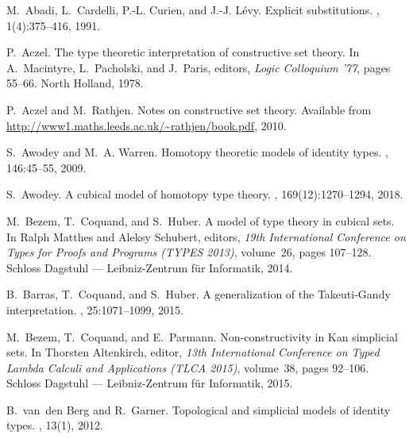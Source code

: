 \documentclass[reqno,10pt,a4paper,oneside]{amsart}
\numberwithin{equation}{section}
\theoremstyle{mythm}
\theoremstyle{mydef}
\theoremstyle{myrmk}
\begin{document}
\newcommand{\noopsort}[1]{}
\begin{thebibliography}{{\noopsort{Berg A}}dBM15}

M.~Abadi, L.~Cardelli, P.-L. Curien, and J.-J. L\'evy.
\newblock Explicit substitutions.
, 1(4):375--416, 1991.

P.~Aczel.
\newblock The type theoretic interpretation of constructive set theory.
\newblock In A.~Macintyre, L.~Pacholski, and J.~Paris, editors, {\em Logic
  Colloquium '77}, pages 55--66. North Holland, 1978.

P.~Aczel and M.~Rathjen.
\newblock Notes on constructive set theory.
\newblock Available from \url{http://www1.maths.leeds.ac.uk/~rathjen/book.pdf},
  2010.

S.~Awodey and M.~A. Warren.
\newblock Homotopy theoretic models of identity types.
, 146:45--55, 2009.

S.~Awodey.
\newblock A cubical model of homotopy type theory.
, 169(12):1270--1294, 2018.

M.~Bezem, T.~Coquand, and S.~Huber.
\newblock A model of type theory in cubical sets.
\newblock In Ralph Matthes and Aleksy Schubert, editors, {\em 19th
  International Conference on Types for Proofs and Programs (TYPES 2013)},
  volume~26, pages 107--128. Schloss Dagstuhl --- Leibniz-Zentrum f{\"u}r
  Informatik, 2014.

B.~Barras, T.~Coquand, and S.~Huber.
\newblock A generalization of the {T}akeuti-{G}andy interpretation.
, 25:1071--1099,
  2015.

M.~Bezem, T.~Coquand, and E.~Parmann.
\newblock Non-constructivity in {K}an simplicial sets.
\newblock In Thorsten Altenkirch, editor, {\em 13th International Conference on
  Typed Lambda Calculi and Applications (TLCA 2015)}, volume~38, pages 92--106.
  Schloss Dagstuhl --- Leibniz-Zentrum f{\"u}r Informatik, 2015.

\bibitem[{\noopsort{Berg A}}dBG12]{BergB:topsmi}
B.~{\noopsort{Berg A}}van~den Berg and R.~Garner.
\newblock Topological and simplicial models of identity types.
, 13(1), 2012.


\end{thebibliography}
\end{document}
